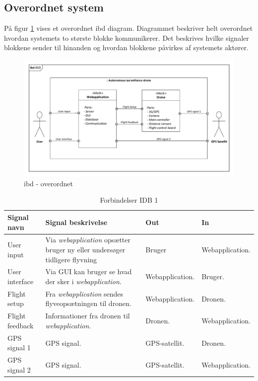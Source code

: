 \subsection{Overordnet system}

På figur \ref{fig:ibd_overordnet} vises et overordnet ibd diagram. Diagrammet beskriver helt overordnet hvordan systemets to største blokke kommunikerer. Det beskrives hvilke signaler blokkene sender til hinanden og hvordan blokkene påvirkes af systemets aktører. 

\begin{figure}[H]
\centering
\includegraphics[width=1\textwidth]{Billeder/IBD/ibd1_overordnet.pdf}
\vspace{-1cm}
\caption{ibd - overordnet}
\label{fig:ibd_overordnet}
\end{figure}

\begin{table}[H]
	\centering
		\begin{tabular}{|p{2.6 cm}|p{4.9 cm}|p{2.5 cm}|p{2.5 cm}|} 
		\hline
			\textbf{Signal navn} 	& \textbf{Signal beskrivelse}		& \textbf{Out} 				& \textbf{In}     \\ \hline
			User input 			& Via \textit{webapplication} opsætter bruger ny eller undersøger tidligere flyvning & Bruger 		& Webapplication.			    \\ \hline
			User interface 		& Via GUI kan bruger se hvad der sker i \textit{webapplication}.	& Webapplication.			& Bruger.				\\ \hline
			Flight setup		& Fra \textit{webapplication} sendes flyveopsætningen til dronen.	& Webapplication.	& Dronen.	\\ \hline
			Flight feedback		& Informationer fra dronen til \textit{webapplication}.	& 	Dronen.		& Webapplication.			    \\ \hline
			GPS signal 1		& GPS signal.	& GPS-satellit.			& Dronen.				\\ \hline
			GPS signal 2		& GPS signal.	& GPS-satellit.				& Webapplication.	\\ \hline  
		\end{tabular}
	\caption{Forbindelser IDB 1}
	\label{tab:IDB1}
\end{table}

